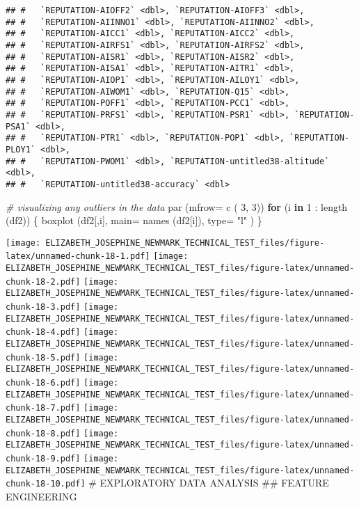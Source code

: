 \documentclass[
]{article}
\newenvironment{Shaded}{\begin{snugshade}}{\end{snugshade}}
\newcommand{\AttributeTok}[1]{\textcolor[rgb]{0.77,0.63,0.00}{#1}}
\newcommand{\CommentTok}[1]{\textcolor[rgb]{0.56,0.35,0.01}{\textit{#1}}}
\newcommand{\ControlFlowTok}[1]{\textcolor[rgb]{0.13,0.29,0.53}{\textbf{#1}}}
\newcommand{\DecValTok}[1]{\textcolor[rgb]{0.00,0.00,0.81}{#1}}
\newcommand{\FunctionTok}[1]{\textcolor[rgb]{0.00,0.00,0.00}{#1}}
\newcommand{\NormalTok}[1]{#1}
\newcommand{\SpecialCharTok}[1]{\textcolor[rgb]{0.00,0.00,0.00}{#1}}
\newcommand{\StringTok}[1]{\textcolor[rgb]{0.31,0.60,0.02}{#1}}
\begin{document}
\begin{verbatim}
## #   `REPUTATION-AIOFF2` <dbl>, `REPUTATION-AIOFF3` <dbl>,
## #   `REPUTATION-AIINNO1` <dbl>, `REPUTATION-AIINNO2` <dbl>,
## #   `REPUTATION-AICC1` <dbl>, `REPUTATION-AICC2` <dbl>,
## #   `REPUTATION-AIRFS1` <dbl>, `REPUTATION-AIRFS2` <dbl>,
## #   `REPUTATION-AISR1` <dbl>, `REPUTATION-AISR2` <dbl>,
## #   `REPUTATION-AISA1` <dbl>, `REPUTATION-AITR1` <dbl>,
## #   `REPUTATION-AIOP1` <dbl>, `REPUTATION-AILOY1` <dbl>,
## #   `REPUTATION-AIWOM1` <dbl>, `REPUTATION-Q15` <dbl>,
## #   `REPUTATION-POFF1` <dbl>, `REPUTATION-PCC1` <dbl>,
## #   `REPUTATION-PRFS1` <dbl>, `REPUTATION-PSR1` <dbl>, `REPUTATION-PSA1` <dbl>,
## #   `REPUTATION-PTR1` <dbl>, `REPUTATION-POP1` <dbl>, `REPUTATION-PLOY1` <dbl>,
## #   `REPUTATION-PWOM1` <dbl>, `REPUTATION-untitled38-altitude` <dbl>,
## #   `REPUTATION-untitled38-accuracy` <dbl>
\end{verbatim}

\begin{Shaded}
\begin{Highlighting}[]
\CommentTok{\# visualizing any outliers in the data}
\FunctionTok{par}\NormalTok{ (}\AttributeTok{mfrow=} \FunctionTok{c}\NormalTok{ ( }\DecValTok{3}\NormalTok{, }\DecValTok{3}\NormalTok{))}
\ControlFlowTok{for}\NormalTok{ (i }\ControlFlowTok{in} \DecValTok{1} \SpecialCharTok{:} \FunctionTok{length}\NormalTok{ (df2)) \{}
\FunctionTok{boxplot}\NormalTok{ (df2[,i], }\AttributeTok{main=} \FunctionTok{names}\NormalTok{ (df2[i]), }\AttributeTok{type=} \StringTok{"l"}\NormalTok{ )}
\NormalTok{\}}
\end{Highlighting}
\end{Shaded}

\texttt{[image: ELIZABETH\_JOSEPHINE\_NEWMARK\_TECHNICAL\_TEST\_files/figure-latex/unnamed-chunk-18-1.pdf]}
\texttt{[image: ELIZABETH\_JOSEPHINE\_NEWMARK\_TECHNICAL\_TEST\_files/figure-latex/unnamed-chunk-18-2.pdf]}
\texttt{[image: ELIZABETH\_JOSEPHINE\_NEWMARK\_TECHNICAL\_TEST\_files/figure-latex/unnamed-chunk-18-3.pdf]}
\texttt{[image: ELIZABETH\_JOSEPHINE\_NEWMARK\_TECHNICAL\_TEST\_files/figure-latex/unnamed-chunk-18-4.pdf]}
\texttt{[image: ELIZABETH\_JOSEPHINE\_NEWMARK\_TECHNICAL\_TEST\_files/figure-latex/unnamed-chunk-18-5.pdf]}
\texttt{[image: ELIZABETH\_JOSEPHINE\_NEWMARK\_TECHNICAL\_TEST\_files/figure-latex/unnamed-chunk-18-6.pdf]}
\texttt{[image: ELIZABETH\_JOSEPHINE\_NEWMARK\_TECHNICAL\_TEST\_files/figure-latex/unnamed-chunk-18-7.pdf]}
\texttt{[image: ELIZABETH\_JOSEPHINE\_NEWMARK\_TECHNICAL\_TEST\_files/figure-latex/unnamed-chunk-18-8.pdf]}
\texttt{[image: ELIZABETH\_JOSEPHINE\_NEWMARK\_TECHNICAL\_TEST\_files/figure-latex/unnamed-chunk-18-9.pdf]}
\texttt{[image: ELIZABETH\_JOSEPHINE\_NEWMARK\_TECHNICAL\_TEST\_files/figure-latex/unnamed-chunk-18-10.pdf]}
\# EXPLORATORY DATA ANALYSIS \#\# FEATURE ENGINEERING
\end{document}
